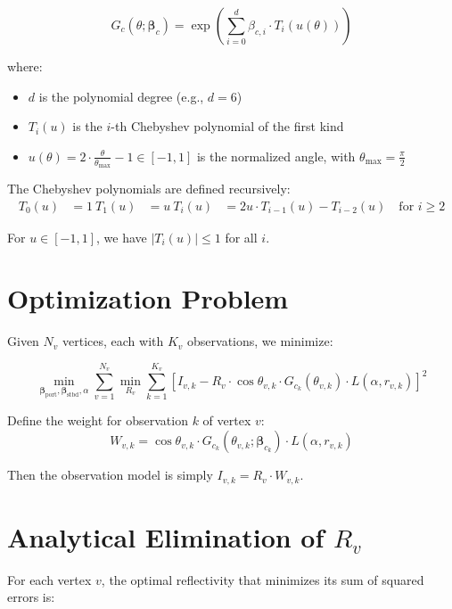\documentclass[11pt]{article}
\begin{document}
\begin{equation*}
G_c(\theta; \bm{\beta}_c) = \exp\left(\sum_{i=0}^{d} \beta_{c,i} \cdot T_i(u(\theta))\right)
\end{equation*}

where:
\begin{itemize}
    \item $d$ is the polynomial degree (e.g., $d = 6$)
    \item $T_i(u)$ is the $i$-th Chebyshev polynomial of the first kind
    \item $u(\theta) = 2 \cdot \frac{\theta}{\theta_{\text{max}}} - 1 \in [-1, 1]$ is the normalized angle, with $\theta_{\text{max}} = \frac{\pi}{2}$
\end{itemize}

The Chebyshev polynomials are defined recursively:
\begin{align*}
T_0(u) &= 1 \
T_1(u) &= u \
T_i(u) &= 2u \cdot T_{i-1}(u) - T_{i-2}(u) \quad \text{for } i \geq 2
\end{align*}

For $u \in [-1, 1]$, we have $|T_i(u)| \leq 1$ for all $i$.

\section{Optimization Problem}

Given $N_v$ vertices, each with $K_v$ observations, we minimize:

\begin{equation*}
\min_{\bm{\beta}_\text{port}, \bm{\beta}_\text{stbd}, \alpha} \sum_{v=1}^{N_v} \min_{R_v} \sum_{k=1}^{K_v} \left[I_{v,k} - R_v \cdot \cos\theta_{v,k} \cdot G_{c_k}(\theta_{v,k}) \cdot L(\alpha, r_{v,k})\right]^2
\end{equation*}

Define the weight for observation $k$ of vertex $v$:
\begin{equation*}
W_{v,k} = \cos\theta_{v,k} \cdot G_{c_k}(\theta_{v,k}; \bm{\beta}_{c_k}) \cdot L(\alpha, r_{v,k})
\end{equation*}

Then the observation model is simply $I_{v,k} = R_v \cdot W_{v,k}$.

\section{Analytical Elimination of $R_v$}

For each vertex $v$, the optimal reflectivity that minimizes its sum of squared errors is:
\end{document}
